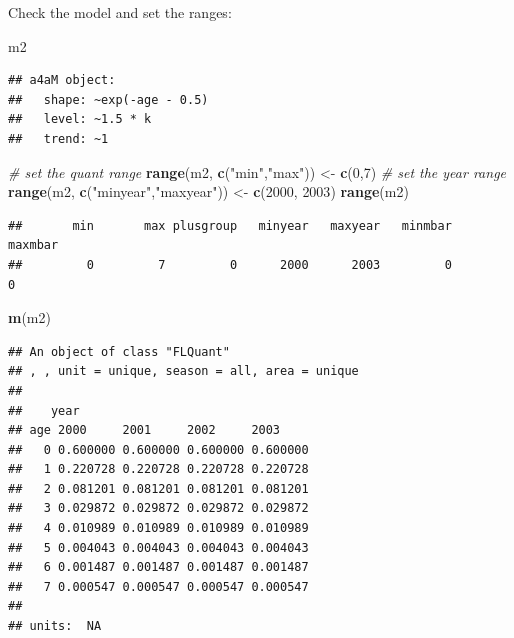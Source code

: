 \documentclass[
]{book}
\newenvironment{Shaded}{\begin{snugshade}}{\end{snugshade}}
\newcommand{\CommentTok}[1]{\textcolor[rgb]{0.56,0.35,0.01}{\textit{#1}}}
\newcommand{\DecValTok}[1]{\textcolor[rgb]{0.00,0.00,0.81}{#1}}
\newcommand{\FunctionTok}[1]{\textcolor[rgb]{0.13,0.29,0.53}{\textbf{#1}}}
\newcommand{\NormalTok}[1]{#1}
\newcommand{\OtherTok}[1]{\textcolor[rgb]{0.56,0.35,0.01}{#1}}
\newcommand{\StringTok}[1]{\textcolor[rgb]{0.31,0.60,0.02}{#1}}
\begin{document}
Check the model and set the ranges:

\begin{Shaded}
\begin{Highlighting}[]
\NormalTok{m2}
\end{Highlighting}
\end{Shaded}

\begin{verbatim}
## a4aM object:
##   shape: ~exp(-age - 0.5)
##   level: ~1.5 * k
##   trend: ~1
\end{verbatim}

\begin{Shaded}
\begin{Highlighting}[]
\CommentTok{\# set the quant range}
\FunctionTok{range}\NormalTok{(m2, }\FunctionTok{c}\NormalTok{(}\StringTok{"min"}\NormalTok{,}\StringTok{"max"}\NormalTok{)) }\OtherTok{\textless{}{-}} \FunctionTok{c}\NormalTok{(}\DecValTok{0}\NormalTok{,}\DecValTok{7}\NormalTok{)}
\CommentTok{\# set the year range}
\FunctionTok{range}\NormalTok{(m2, }\FunctionTok{c}\NormalTok{(}\StringTok{"minyear"}\NormalTok{,}\StringTok{"maxyear"}\NormalTok{)) }\OtherTok{\textless{}{-}} \FunctionTok{c}\NormalTok{(}\DecValTok{2000}\NormalTok{, }\DecValTok{2003}\NormalTok{)}
\FunctionTok{range}\NormalTok{(m2)}
\end{Highlighting}
\end{Shaded}

\begin{verbatim}
##       min       max plusgroup   minyear   maxyear   minmbar   maxmbar 
##         0         7         0      2000      2003         0         0
\end{verbatim}

\begin{Shaded}
\begin{Highlighting}[]
\FunctionTok{m}\NormalTok{(m2)}
\end{Highlighting}
\end{Shaded}

\begin{verbatim}
## An object of class "FLQuant"
## , , unit = unique, season = all, area = unique
## 
##    year
## age 2000     2001     2002     2003    
##   0 0.600000 0.600000 0.600000 0.600000
##   1 0.220728 0.220728 0.220728 0.220728
##   2 0.081201 0.081201 0.081201 0.081201
##   3 0.029872 0.029872 0.029872 0.029872
##   4 0.010989 0.010989 0.010989 0.010989
##   5 0.004043 0.004043 0.004043 0.004043
##   6 0.001487 0.001487 0.001487 0.001487
##   7 0.000547 0.000547 0.000547 0.000547
## 
## units:  NA
\end{verbatim}
\end{document}

